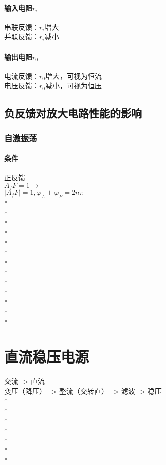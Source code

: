 \documentclass[UTF8, fontset=none]{ctexart}
\begin{document}
\begin{multicols*}{8}
\paragraph{输入电阻$r_i$}
串联反馈：$r_i$增大\\
并联反馈：$r_i$减小\\
\paragraph{输出电阻$r_0$}
电流反馈：$r_0$增大，可视为恒流\\
电压反馈：$r_0$减小，可视为恒压\\
\subsection{负反馈对放大电路性能的影响}
\subsubsection{自激振荡}
\paragraph{条件}
正反馈\\
$A_fF = 1 \rightarrow$\\
$|A_fF| = 1, \varphi_A + \varphi_F = 2n\pi $\\
*\\
*\\
*\\
*\\
*\\
*\\
*\\
*\\
*\\
*\\
*\\
*\\
*

\section{直流稳压电源}
交流 -> 直流\\
变压（降压） -> 整流（交转直） -> 滤波 -> 稳压\\%
*\\
*\\
*\\
*\\
*\\
*\\
*\\

\end{multicols*}
\end{document}
